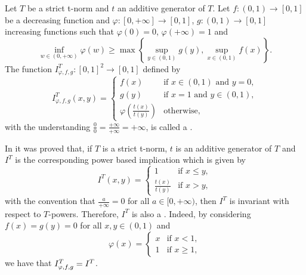 \begin{definition}\label{def:strict:TPowerInv} Let $T$ be a strict t-norm and $t$ an additive generator of $T$. Let $f:(0,1) \to [0,1]$ be a decreasing function and $\varphi : [0,+\infty] \to [0,1]$, $g:(0,1) \to [0,1]$  increasing functions such that $ \varphi(0)=0$,  $\varphi(+\infty)=1$ and 
	\begin{equation}
		\displaystyle\inf_{w \in (0,+\infty)} \varphi (w) \geq \max \left\lbrace \sup_{y \in (0,1)} g(y), \sup_{x \in (0,1)} f(x) \right\rbrace.
		\label{eq:strict:TPowerInv:MonotonicityCond}
	\end{equation}
	The function $I^T_{\varphi,f,g}:[0,1]^2 \to [0,1]$ defined by
	\begin{equation}
		I^T_{\varphi,f,g}(x,y) =\left\{ \begin{array}{ll}
			f(x) &   \text{if }   x \in (0,1) \text{ and } y=0, \\
			g(y) &  \text{if }  x = 1 \text{ and } y\in (0,1), \\
			\varphi \left(\frac{t(x)}{t(y)}\right) &  \text{otherwise},
		\end{array}
		\right.
		\label{eq:strict:TPowerInv:Expression}
	\end{equation}
	with the understanding $\frac{0}{0}=\frac{+\infty}{+\infty}=+\infty$, is called a \emph{\STP}.
\end{definition}

\begin{remark} In \cite{Massanet2017} it was proved that,  if $T$ is a strict t-norm, $t$ is an additive generator of $T$ and $I^T$ is the corresponding power based implication which is given by
	$$ 
	I^{T}(x,y) =\left\{ \begin{array}{ll}
		1 &   \text{if }   x \leq y, \\
		\frac{t(x)}{t(y)} &  \text{if } x>y,
	\end{array}
	\right.
	$$
with the convention that $\frac{a}{+\infty}=0$ for all $a \in [0,+\infty)$, then $I^T$ is invariant with respect to $T$-powers. Therefore, $I^T$ is also a \STP. Indeed, by considering $f(x)=g(y)=0$ for all $x,y \in (0,1)$ and
	$$ 
	\varphi(x) =\left\{ \begin{array}{ll}
		x &   \text{if }   x < 1, \\
		1 &  \text{if } x \geq 1,
	\end{array}
	\right.
	$$
	we have that $I^T_{\varphi,f,g} = I^T$.
\end{remark}

